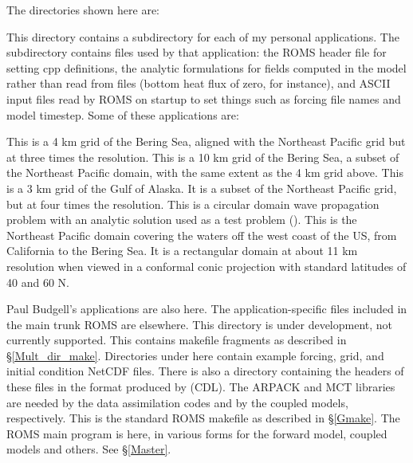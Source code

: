 The directories shown here are:
\begin{klist}
   This directory contains a subdirectory for each of my
  personal applications. The subdirectory contains files used by that
  application: the ROMS header file for setting cpp definitions, the
  analytic formulations for fields computed in the model rather than
  read from files (bottom heat flux of zero, for instance), and ASCII
  input files read by ROMS on startup to set things such as forcing file
  names and model timestep. Some of these applications are:
\begin{klist}
   This is a 4 km grid of the Bering Sea, aligned with
  the Northeast Pacific grid but at three times the resolution.
   This is a 10 km grid of the Bering Sea, a
  subset of the Northeast Pacific domain, with the same extent as
  the 4 km grid above.
   This is a 3 km grid of the Gulf of Alaska. It is a
  subset of the Northeast Pacific grid, but at four times the
  resolution.
   This is a circular domain wave propagation problem
  with an analytic solution used as a test problem (\cite{Lamb32}).
   This is the Northeast Pacific domain covering the
  waters off the west coast of the US, from California to the Bering
  Sea. It is a rectangular domain at about 11 km resolution when
  viewed in a conformal conic projection with standard latitudes of
  40 and 60 N.
\end{klist}
  Paul Budgell's applications are also here. The application-specific
  files included in the main trunk ROMS are elsewhere.
   This directory is under development, not
  currently supported.
   This contains makefile fragments as described in
  \S\ref{Mult_dir_make}.
   Directories under here contain example forcing, grid,
  and initial condition NetCDF files. There is also a directory
  containing the headers of these files in the format produced by
   (CDL).
   The ARPACK and MCT libraries are needed by the data
  assimilation codes and by the coupled models, respectively.
   This is the standard ROMS makefile as described
  in \S\ref{Gmake}.
   The ROMS main program is here, in various forms for
  the forward model, coupled models and others. See \S\ref{Master}.


\end{klist}
